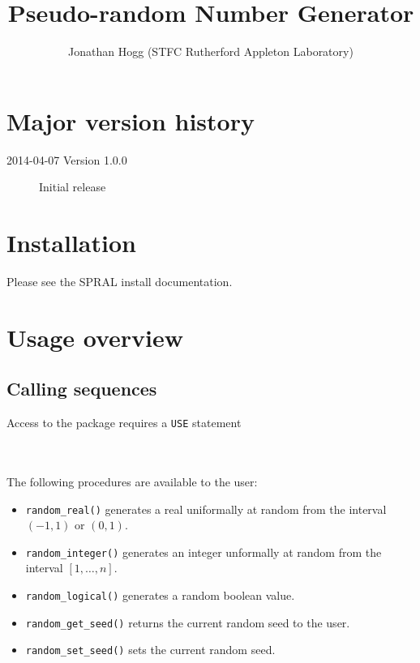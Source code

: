
\title{Pseudo-random Number Generator}
\author{
   Jonathan Hogg (STFC Rutherford Appleton Laboratory) \\
}
\spralmaketitle
\thispagestyle{firststyle}

\section*{Major version history}
\begin{description}
\item[2014-04-07 Version 1.0.0] Initial release
\end{description}


\section{Installation}
Please see the SPRAL install documentation.


\section{Usage overview}

\subsection{Calling sequences}

Access to the package requires a {\tt USE} statement \\ \\
\indent\hspace{8mm}{\tt use spral\_random} \\

\medskip

\noindent
The following procedures are available to the user:
\begin{itemize}
\item {\tt random\_real()} generates a real uniformally at random from the interval $(-1,1)$ or $(0,1)$.
\item {\tt random\_integer()} generates an integer unformally at random from the interval $[1,\ldots,n]$.
\item {\tt random\_logical()} generates a random boolean value.
\item {\tt random\_get\_seed()} returns the current random seed to the user.
\item {\tt random\_set\_seed()} sets the current random seed.
\end{itemize}

